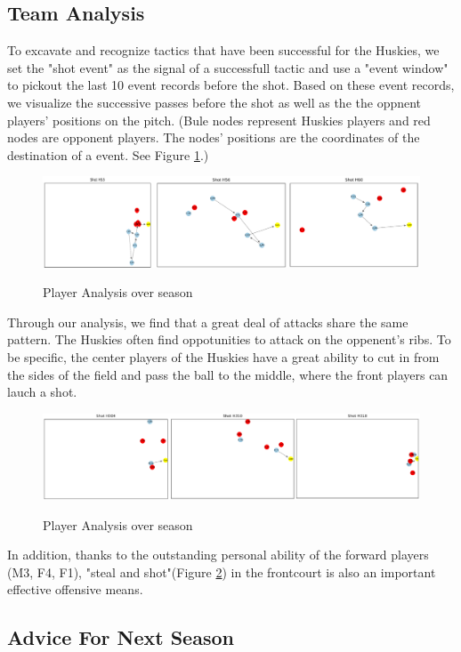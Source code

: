 \documentclass{mcmthesis}
\begin{document}
\subsection{Team Analysis}
To excavate and recognize tactics that have been successful for the Huskies, we set the "shot event" as the signal of a successfull tactic and use a "event window" to pickout the last 10 event records before the shot. Based on these event records, we visualize the successive passes before the shot as well as the the oppnent players' positions on the pitch. (Bule nodes represent Huskies players and red nodes are opponent players. The nodes' positions are the coordinates of the destination of a event. See Figure \ref{shot}.) 
\begin{figure}[htbp]
  \centering
  \caption{Player Analysis over season}
  \includegraphics[width=15cm]{shot.png}
  \label{shot}
\end{figure}
Through our analysis, we find that a great deal of attacks share the same pattern. The Huskies often find oppotunities to attack on the oppenent's ribs. To be specific, the center players of the Huskies have a great ability to cut in from the sides of the field and pass the ball to the middle, where the front players can lauch a shot. 

\begin{figure}[htbp]
  \centering
  \caption{Player Analysis over season}
  \includegraphics[width=15cm]{shot2.png}
  \label{shot2}
\end{figure}

In addition, thanks to the outstanding personal ability of the forward players (M3, F4, F1), "steal and shot"(Figure \ref{shot2}) in the frontcourt is also an important effective offensive means.

\subsection{Advice For Next Season}
\end{document}
